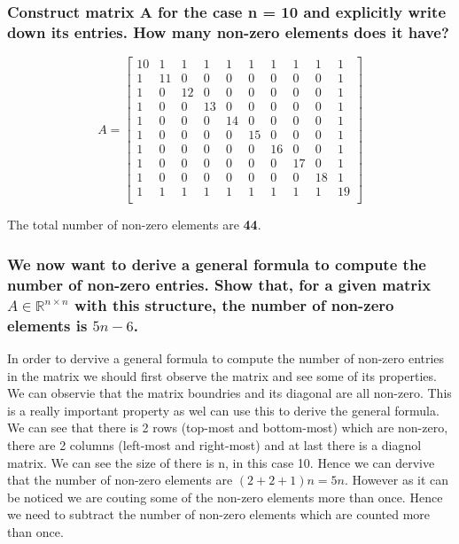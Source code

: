 \documentclass[unicode,11pt,a4paper,oneside,numbers=endperiod,openany]{scrartcl}
\begin{document}
\subsubsection{Construct matrix A for the case n = 10 and explicitly write down its entries. How many non-zero elements does it have?}
\[ A =
    \begin{bmatrix}
        10 & 1  & 1  & 1  & 1  & 1  & 1  & 1  & 1  & 1  \\
        1  & 11 & 0  & 0  & 0  & 0  & 0  & 0  & 0  & 1  \\
        1  & 0  & 12 & 0  & 0  & 0  & 0  & 0  & 0  & 1  \\
        1  & 0  & 0  & 13 & 0  & 0  & 0  & 0  & 0  & 1  \\
        1  & 0  & 0  & 0  & 14 & 0  & 0  & 0  & 0  & 1  \\
        1  & 0  & 0  & 0  & 0  & 15 & 0  & 0  & 0  & 1  \\
        1  & 0  & 0  & 0  & 0  & 0  & 16 & 0  & 0  & 1  \\
        1  & 0  & 0  & 0  & 0  & 0  & 0  & 17 & 0  & 1  \\
        1  & 0  & 0  & 0  & 0  & 0  & 0  & 0  & 18 & 1  \\
        1  & 1  & 1  & 1  & 1  & 1  & 1  & 1  & 1  & 19 \\
    \end{bmatrix}
\]

The total number of non-zero elements are \textbf{44}.

\subsubsection{We now want to derive a general formula to compute the number of non-zero entries. Show that, for a given matrix \texorpdfstring{\(A \in \mathbb{R}^{n \times n}\)}{A in R^n x n} with this structure, the number of non-zero elements is \(5n - 6\).}

In order to dervive a general formula to compute the number of non-zero entries in the matrix we should first observe the matrix and see some of its properties. We can observie that the matrix boundries and its diagonal are all non-zero. This is a really important property as wel can use this to derive the general formula. \\

We can see that there is 2 rows (top-most and bottom-most) which are non-zero, there are 2 columns (left-most and right-most) and at last there is a diagnol matrix. We can see the size of there is n, in this case 10. Hence we can dervive that the number of non-zero elements are $(2 + 2 + 1)n = 5n$. However as it can be noticed we are couting some of the non-zero elements more than once. Hence we need to subtract the number of non-zero elements which are counted more than once. \\
\end{document}
